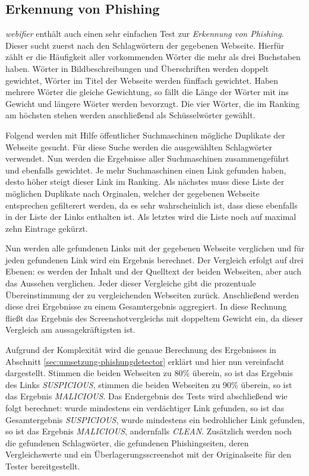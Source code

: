 \subsection{Erkennung von Phishing}

\textit{webifier} enthält auch einen sehr einfachen Test zur \textit{Erkennung von Phishing}. Dieser
sucht zuerst nach den Schlagwörtern der gegebenen Webseite. Hierfür zählt er die Häufigkeit aller
vorkommenden Wörter die mehr als drei Buchstaben haben. Wörter in Bildbeschreibungen und
Überschriften werden doppelt gewichtet, Wörter im Titel der Webseite werden fünffach gewichtet.
Haben mehrere Wörter die gleiche Gewichtung, so fällt die Länge der Wörter mit ins Gewicht und
längere Wörter werden bevorzugt. Die vier Wörter, die im Ranking am höchsten stehen werden
anschließend als Schüsselwörter gewählt.

Folgend werden mit Hilfe öffentlicher Suchmaschinen mögliche Duplikate der Webseite gesucht.
Für diese Suche werden die ausgewählten Schlagwörter verwendet. Nun werden die Ergebnisse aller
Suchmaschinen zusammengeführt und ebenfalls gewichtet. Je mehr Suchmaschinen einen Link gefunden
haben, desto höher steigt dieser Link im Ranking. Als nächstes muss diese Liste der möglichen
Duplikate nach Orginalen, welcher der gegebenen Webseite entsprechen gefilterert werden, da es sehr
wahrscheinlich ist, dass diese ebenfalls in der Liste der Links enthalten ist. Als letztes wird die
Liste noch auf maximal zehn Eintrage gekürzt.

Nun werden alle gefundenen Links mit der gegebenen Webseite verglichen und für jeden gefundenen Link
wird ein Ergebnis berechnet. Der Vergleich erfolgt auf drei Ebenen: es werden der Inhalt und der
Quelltext der beiden Webseiten, aber auch das Aussehen verglichen. Jeder dieser Vergleiche gibt die
prozentuale Übereinstimmung der zu vergleichenden Webseiten zurück. Anschließend werden diese drei
Ergebnisse zu einem Gesamtergebnis aggregiert. In diese Rechnung fließt das Ergebnis des
Screenshotvergleichs mit doppeltem Gewicht ein, da dieser Vergleich am aussagekräftigsten ist.

Aufgrund der Komplexität wird die genaue Berechnung des Ergebnisses in Abschnitt \ref{sec:umsetzung-phishungdetector} erklärt und hier nun vereinfacht dargestellt. Stimmen die beiden Webseiten zu 80\% überein, so ist das Ergebnis des Links \textit{SUSPICIOUS}, stimmen die beiden Webseiten zu 90\% überein, so ist das Ergebnis \textit{MALICIOUS}. Das Endergebnis des Tests wird abschließend wie folgt berechnet: wurde mindestens ein verdächtiger Link gefunden, so ist das Gesamtergebnis \textit{SUSPICIOUS}, wurde mindestens ein bedrohlicher Link gefunden, so ist das Ergebnis \textit{MALICIOUS}, andernfalls \textit{CLEAN}. Zusätzlich werden noch die gefundenen Schlagwörter, die gefundenen Phishingseiten, deren Vergleichswerte und ein Überlagerungsscreenshot mit der Originalseite für den Tester bereitgestellt.

